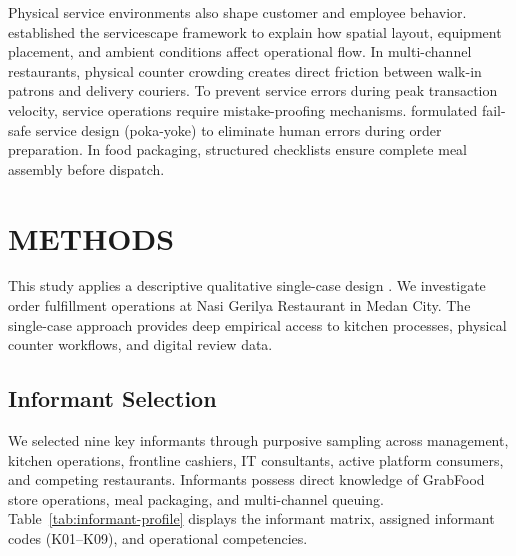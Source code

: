 \documentclass{jomas}
\begin{document}
Physical service environments also shape customer and employee behavior. \textcite{bitner1992servicescapes} established the servicescape framework to explain how spatial layout, equipment placement, and ambient conditions affect operational flow. In multi-channel restaurants, physical counter crowding creates direct friction between walk-in patrons and delivery couriers. To prevent service errors during peak transaction velocity, service operations require mistake-proofing mechanisms. \textcite{chase1994failsafe} formulated fail-safe service design (poka-yoke) to eliminate human errors during order preparation. In food packaging, structured checklists ensure complete meal assembly before dispatch.

\section{METHODS}
This study applies a descriptive qualitative single-case design \parencite{yin2018casestudy}. We investigate order fulfillment operations at Nasi Gerilya Restaurant in Medan City. The single-case approach provides deep empirical access to kitchen processes, physical counter workflows, and digital review data.

\subsection{Informant Selection}
We selected nine key informants through purposive sampling across management, kitchen operations, frontline cashiers, IT consultants, active platform consumers, and competing restaurants. Informants possess direct knowledge of GrabFood store operations, meal packaging, and multi-channel queuing. Table~\ref{tab:informant-profile} displays the informant matrix, assigned informant codes (K01--K09), and operational competencies.
\end{document}
